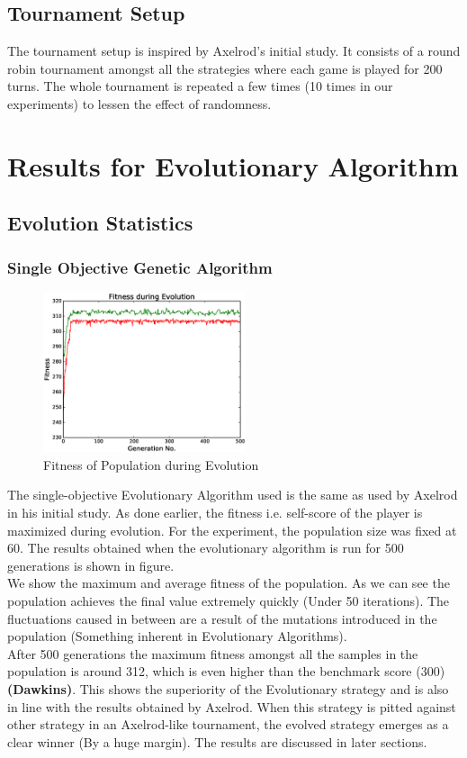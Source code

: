 \documentclass[a4paper]{article}
\begin{document}
	\subsection{Tournament Setup}
	
	The tournament setup is inspired by Axelrod's initial study. It consists of a round robin tournament amongst all the strategies where each game is played for 200 turns. The whole tournament is repeated a few times (10 times in our experiments) to lessen the effect of randomness.

	\section{Results for Evolutionary Algorithm}

	\subsection{Evolution Statistics}

	\subsubsection{Single Objective Genetic Algorithm}	

	\begin{figure}
	\centering
	\includegraphics[width=0.53\textwidth]{singFitPlot.eps}
	\caption{\footnotesize{Fitness of Population during Evolution}}
	\end{figure}
	The single-objective Evolutionary Algorithm used is the same as used by Axelrod in his initial study. As done earlier, the fitness i.e. self-score of the player is maximized during evolution. For the experiment, the population size was fixed at 60. The results obtained when the evolutionary algorithm is run for 500 generations is shown in figure.\\
	We show the maximum and average fitness of the population. As we can see the population achieves the final value extremely quickly (Under 50 iterations). The fluctuations caused in between are a result of the mutations introduced in the population (Something inherent in Evolutionary Algorithms).\\
	After 500 generations the maximum fitness amongst all the samples in the population is around 312, which is even higher than the benchmark score (300) \textbf{(Dawkins)}. This shows the superiority of the Evolutionary strategy and is also in line with the results obtained by Axelrod. When this strategy is pitted against other strategy in an Axelrod-like tournament, the evolved strategy emerges as a clear winner (By a huge margin). The results are discussed in later sections.	
\end{document}
